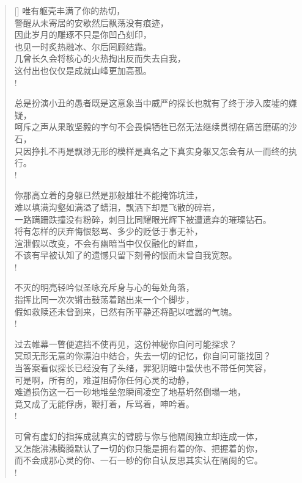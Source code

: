 \documentclass[UTF8, 12pt, a4paper]{ctexrep} %
\begin{document}
\begin{verse}[\versewidth]
唯有躯壳丰满了你的热切，\\
警醒从未寄居的安歇然后飘荡没有痕迹，\\
因此岁月的雕琢不只是你凹凸刻印，\\
也见一时炙热融冰、尔后罔顾结霜。\\
几曾长久会将核心的火热掏出反而失去自我，\\
这付出也仅仅是成就山峰更加高孤。\\!

总是扮演小丑的愚者既是这意象当中威严的探长也就有了终于涉入废墟的嫌疑，\\
呵斥之声从果敢坚毅的字句不会畏惧牺牲已然无法继续贯彻在痛苦磨砺的沙石，\\
只因挣扎不再是飘渺无形的模样是真名之下真实身躯又怎会有从一而终的执行。\\!

你那高立着的身躯已然是那般雄壮不能掩饰坑洼，\\
难以填满沟壑如满溢了蜡泪，飘洒下却是飞散的碎岩，\\
一路蹒跚跌撞没有粉碎，刺目比同耀眼光辉下被遭遗弃的璀璨钻石。\\
将有怎样的厌弃悔恨怒骂、多少的贬低于事无补，\\
渲泄假以改变，不会有幽暗当中仅仅融化的鲜血，\\
不该有早被认知了的遗憾只留下刻骨的恨而未曾自我宽恕。\\!

不灭的明亮轻吟似圣咏充斥身与心的每处角落，\\
指挥比同一次次锵击鼓荡着踏出来一个个脚步，\\
假如救赎还未曾到来，已然有所平静还将配以喧嚣的气魄。\\!

过去帷幕一瞥便遮挡不使再见，这份神秘你自问可能探求？\\
冥顽无形无意的你漂泊中结合，失去一切的记忆，你自问可能找回？\\
当答案看似探长已经没有了头绪，罪犯阴暗中蛰伏也不带任何笑容，\\
可是啊，所有的，难道阻碍你任何心灵的动静，\\
难道损伤这一石一砂地堆垒忽瞬间凌空了地基坍然倒塌一地，\\
竟又成了无能俘虏，鞭打着，斥骂着，呻吟着。\\!

可曾有虚幻的指挥成就真实的臂膀与你与他隔阂独立却连成一体，\\
又怎能沸沸腾腾默认了一切的你只能是拥有着的你、把握着的你，\\
而不会成那心灵的你、一石一砂的你自认反思其实认在隔阂的它。\\!

\end{verse}
\end{document}

